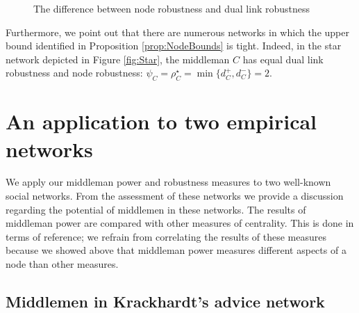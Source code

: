 \begin{figure}[h]
\begin{center}
\end{center}
\caption{The difference between node robustness and dual link robustness}
\label{fig:Line}
\end{figure}

Furthermore, we point out that there are numerous networks in which the upper bound identified in Proposition \ref{prop:NodeBounds} is tight. Indeed, in the star network depicted in Figure \ref{fig:Star}, the middleman $C$ has equal dual link robustness and node robustness: $\psi_C = \rho^{\star}_C = \min \{ d^+_C , d^-_C \} = 2$.

\section{An application to two empirical networks}
\label{sec:empiricalNetwork}

We apply our middleman power and robustness measures to two well-known social networks. From the assessment of these networks we provide a discussion regarding the potential of middlemen in these networks. The results of middleman power are compared with other measures of centrality. This is done in terms of reference; we refrain from correlating the results of these measures because we showed above that middleman power measures different aspects of a node than other measures.

\subsection{Middlemen in Krackhardt's advice network}

